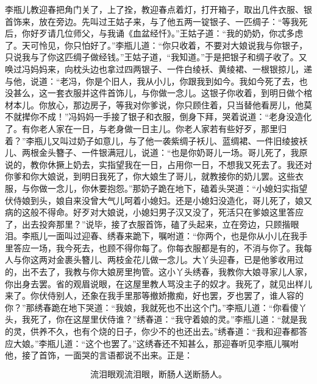 李瓶儿教迎春把角门关了，上了拴，教迎春点着灯，打开箱子，取出几件衣服、银首饰来，放在旁边。先叫过王姑子来，与了他五两一锭银子、一匹绸子：“等我死后，你好歹请几位师父，与我诵《血盆经忏》。”王姑子道：“我的奶奶，你忒多虑了。天可怜见，你只怕好了。”李瓶儿道：“你只收着，不要对大娘说我与你银子，只说我与了你这匹绸子做经钱。”王姑子道，“我知道。”于是把银子和绸子收了。又唤过冯妈妈来，向枕头边也拿过四两银子、一件白绫袄、黄绫裙、一根银掠儿，递与他，说道：“老冯，你是个旧人，我从小儿，你跟我到如今。我如今死了去，也没甚么，这一套衣服并这件首饰儿，与你做一念儿。这银子你收着，到明日做个棺材本儿。你放心，那边房子，等我对你爹说，你只顾住着，只当替他看房儿，他莫不就撵你不成！”冯妈妈一手接了银子和衣服，倒身下拜，哭着说道：“老身没造化了。有你老人家在一日，与老身做一日主儿。你老人家若有些好歹，那里归着？”李瓶儿又叫过奶子如意儿，与了他一袭紫绸子袄儿、蓝绸裙、一件旧绫披袄儿、两根金头簪子、一件银满冠儿，说道：“也是你奶哥儿一场。哥儿死了，我原说的，教你休撅上奶去，实指望我在一日，占用你一日，不想我又死去了。我还对你爹和你大娘说，到明日我死了，你大娘生了哥儿，就教接你的奶儿罢。这些衣服，与你做一念儿，你休要抱怨。”那奶子跪在地下，磕着头哭道：“小媳妇实指望伏侍娘到头，娘自来没曾大气儿呵着小媳妇。还是小媳妇没造化，哥儿死了，娘又病的这般不得命。好歹对大娘说，小媳妇男子汉又没了，死活只在爹娘这里答应了，出去投奔那里？”说毕，接了衣服首饰，磕了头起来，立在旁边，只顾揩眼泪。李瓶儿一面叫过迎春、绣春来跪下，嘱咐道：“你两个，也是你从小儿在我手里答应一场，我今死去，也顾不得你每了。你每衣服都是有的，不消与你了。我每人与你这两对金裹头簪儿、两枝金花儿做一念儿。大丫头迎春，已是他爹收用过的，出不去了，我教与你大娘房里拘管。这小丫头绣春，我教你大娘寻家儿人家，你出身去罢。省的观眉说眼，在这屋里教人骂没主子的奴才。我死了，就见出样儿来了。你伏侍别人，还象在我手里那等撤娇撒痴，好也罢，歹也罢了，谁人容的你？”那绣春跪在地下哭道：“我娘，我就死也不出这个门。”李瓶儿道：“你看傻丫头，我死了，你在这屋里伏侍谁？”绣春道：“我守着娘的灵。”李瓶儿道：“就是我的灵，供养不久，也有个烧的日子，你少不的也还出去。”绣春道：“我和迎春都答应大娘。”李瓶儿道：“这个也罢了。”这绣春还不知甚么，那迎春听见李瓶儿嘱咐他，接了首饰，一面哭的言语都说不出来。正是：

\[
流泪眼观流泪眼，断肠人送断肠人。
\]

